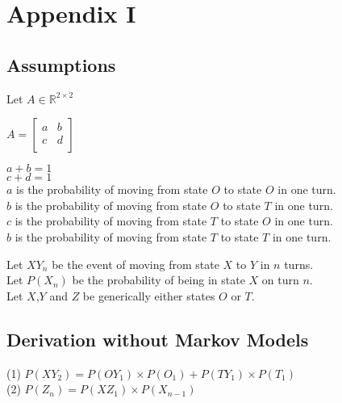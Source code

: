 \section{Appendix I}

\subsection{Assumptions}
Let $A \in \mathbb{R}^{2\times2}$

$A =
\begin{bmatrix}
  a & b\\
  c & d\\
\end{bmatrix}
$

$a+b=1$\\
$c+d=1$\\
$a$ is the probability of moving from state $O$ to state $O$ in one turn.\\
$b$ is the probability of moving from state $O$ to state $T$ in one turn.\\
$c$ is the probability of moving from state $T$ to state $O$ in one turn.\\
$b$ is the probability of moving from state $T$ to state $T$ in one turn.

Let $XY_n$ be the event of moving from state $X$ to $Y$ in $n$ turns. \\
Let $P(X_n)$ be the probability of being in state $X$ on turn $n$.\\
Let $X$,$Y$ and $Z$ be generically either states $O$ or $T$.

\subsection{Derivation without Markov Models}

(1) $P(XY_2) = P(OY_1) \times P(O_1)+P(TY_1) \times P(T_1)$\\
(2) $P(Z_{n}) = P(XZ_1) \times P(X_{n-1})$



